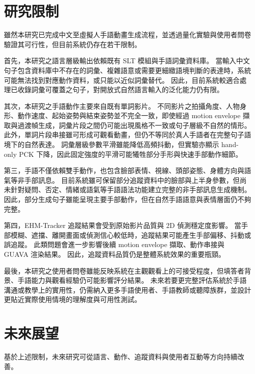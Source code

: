 \documentclass[class=NCU_thesis, crop=false]{standalone}
\begin{document}
\section{研究限制}

雖然本研究已完成中文至虛擬人手語動畫生成流程，並透過量化實驗與使用者問卷驗證其可行性，但目前系統仍存在若干限制。

首先，本研究之語言層級輸出依賴既有 SLT 模組與手語詞彙資料庫。
當輸入中文句子包含資料庫中不存在的詞彙、複雜語意或需要更細緻語境判斷的表達時，系統可能無法找到對應動作資料，或只能以近似詞彙替代。
因此，目前系統較適合處理已收錄詞彙可覆蓋之句子，對開放式自然語言輸入的泛化能力仍有限。

其次，本研究之手語動作主要來自既有單詞影片。
不同影片之拍攝角度、人物身形、動作速度、起始姿勢與結束姿勢並不完全一致，即使經過 motion envelope 擷取與過渡幀生成，詞彙片段之間仍可能出現風格不一致或句子層級不自然的情形。
此外，單詞片段串接雖可形成可觀看動畫，但仍不等同於真人手語者在完整句子語境下的自然表達。
詞彙層級參數平滑雖能降低高頻抖動，但實驗亦顯示 hand-only PCK 下降，因此固定強度的平滑可能犧牲部分手形與快速手部動作細節。

第三，手語不僅依賴雙手動作，也包含臉部表情、視線、頭部姿態、身體方向與語氣等非手部訊息。
目前系統雖可保留部分追蹤資料中的臉部與上半身參數，但尚未針對疑問、否定、情緒或語氣等手語語法功能建立完整的非手部訊息生成機制。
因此，部分生成句子雖能呈現主要手部動作，但在自然手語語意與表情層面仍不夠完整。

第四，EHM-Tracker 追蹤結果會受到原始影片品質與 2D 偵測穩定度影響。
當手部模糊、遮擋、離開畫面或偵測信心較低時，追蹤結果可能產生手部偏移、抖動或誤追蹤。
此類問題會進一步影響後續 motion envelope 擷取、動作串接與 GUAVA 渲染結果。
因此，追蹤資料品質仍是整體系統效果的重要瓶頸。

最後，本研究之使用者問卷雖能反映系統在主觀觀看上的可接受程度，但填答者背景、手語能力與觀看經驗仍可能影響評分結果。
未來若要更完整評估系統於手語溝通或教學上的實用性，仍需納入更多手語使用者、手語教師或聽障族群，並設計更貼近實際使用情境的理解度與可用性測試。

\section{未來展望}

基於上述限制，未來研究可從語言、動作、追蹤資料與使用者互動等方向持續改善。
\end{document}
